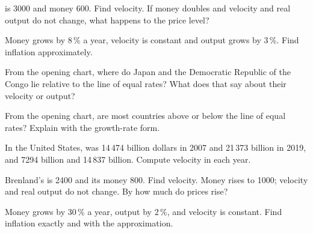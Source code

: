 \begin{exercise}[$\star$]\label{exo:g12:inflation-and-money:2}
 is 3000 and money 600. Find velocity. If money doubles and velocity and real output do not change, what happens to the price level?
\end{exercise}

\begin{exercise}[$\star$]\label{exo:g12:inflation-and-money:3}
Money grows by 8\,\% a year, velocity is constant and output grows by 3\,\%. Find inflation approximately.
\end{exercise}

\begin{exercise}[$\star$]\label{exo:g12:inflation-and-money:4}
From the opening chart, where do Japan and the Democratic Republic of the Congo lie relative to the line of equal rates? What does that say about their velocity or output?
\end{exercise}

\begin{exercise}[$\star$]\label{exo:g12:inflation-and-money:5}
From the opening chart, are most countries above or below the line of equal rates? Explain with the growth-rate form.
\end{exercise}

\begin{exercise}[$\star\star$]\label{exo:g12:inflation-and-money:6}
In the United States,  was 14\,474 billion dollars in 2007 and 21\,373 billion in 2019, and  7294 billion and 14\,837 billion. Compute velocity in each
year.
\end{exercise}

\begin{exercise}[$\star\star$]\label{exo:g12:inflation-and-money:7}
Brenland's  is 2400 and its money 800. Find velocity. Money rises to 1000; velocity and real output do not change. By how much do prices rise?
\end{exercise}

\begin{exercise}[$\star\star$]\label{exo:g12:inflation-and-money:8}
Money grows by 30\,\% a year, output by 2\,\%, and velocity is constant. Find inflation exactly and with the approximation.
\end{exercise}

